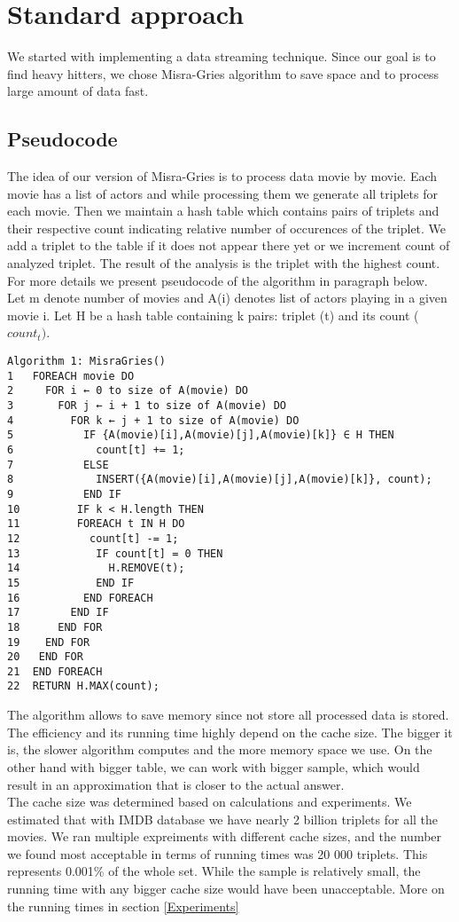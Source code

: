 \section{Standard approach}
\label{Standard}

We started with implementing a data streaming technique. Since our goal is to find heavy hitters, we chose Misra-Gries algorithm to save space and to process large amount of data fast.

\subsection{Pseudocode}
\label{MisraGries}
The idea of our version of Misra-Gries is to process data movie by movie. Each movie has a list of actors and while processing them we generate all triplets for each movie. Then we maintain a hash table which contains pairs of triplets and their respective count indicating relative number of occurences of the triplet. We add a triplet to the table if it does not appear there yet or we increment count of analyzed triplet. The result of the analysis is the triplet with the highest count. For more details we present pseudocode of the algorithm in paragraph below.
\\
Let m denote number of movies and A(i) denotes list of actors playing in a given movie i.
Let H be a hash table containing k pairs: triplet (t) and its count (\(count_t)\).
\begin{verbatim}
Algorithm 1: MisraGries()
1	FOREACH movie DO
2	  FOR i ← 0 to size of A(movie) DO
3	    FOR j ← i + 1 to size of A(movie) DO
4	      FOR k ← j + 1 to size of A(movie) DO
5	        IF {A(movie)[i],A(movie)[j],A(movie)[k]} ∈ H THEN
6	          count[t] += 1;
7	        ELSE
8	          INSERT({A(movie)[i],A(movie)[j],A(movie)[k]}, count);  
9	        END IF
10	       IF k < H.length THEN
11	       FOREACH t IN H DO
12	         count[t] -= 1;
13	          IF count[t] = 0 THEN
14	            H.REMOVE(t);
15	          END IF
16	        END FOREACH
17	      END IF      
18	    END FOR
19	  END FOR
20	 END FOR
21	END FOREACH
22	RETURN H.MAX(count);	  	                    	  
\end{verbatim}

The algorithm allows to save memory since not store all processed data is stored. The efficiency and its running time highly depend on the cache size. The bigger it is, the slower algorithm computes and the more memory space we use. On the other hand with bigger table, we can work with bigger sample, which would result in an approximation that is closer to the actual answer.
\\
The cache size was determined based on calculations and experiments. We estimated that with IMDB database we have nearly 2 billion triplets for all the movies. We ran multiple expreiments with different cache sizes, and the number we found most acceptable in terms of running times was 20 000 triplets. This represents 0.001\% of the whole set. While the sample is relatively small, the running time with any bigger cache size would have been unacceptable. More on the running times in section \ref{Experiments}
\\
